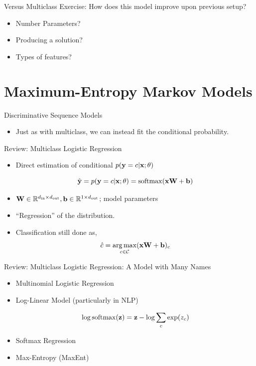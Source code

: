 \documentclass{beamer}
\begin{document}
\begin{frame}{Versus Multiclass}
  Exercise: How does this model improve upon previous setup?
  \begin{itemize}
  \item Number Parameters?
    \air 
  \item Producing a solution?
    \air 

  \item Types of features?
  \end{itemize}
\end{frame}

\section{Maximum-Entropy Markov Models}

\begin{frame}{Discriminative Sequence Models}
  \begin{itemize}
  \item Just as with multiclass, we can instead fit the conditional probability.
    \air 

  \end{itemize}
\end{frame}

\begin{frame}{Review: Multiclass Logistic Regression}
  \begin{itemize}
  \item Direct estimation of conditional $p(\mathbf{y} =c | \mathbf{x}; \theta)$

    \[\hat{\boldy} =  p(\boldy =c | \boldx; \theta) =  \softmax(\boldx \boldW + \boldb) \]
  \item $\mathbf{W} \in \mathbb{R}^{{d_{\mathrm{in}}} \times {d_{\mathrm{out}}}}, \mathbf{b} \in \mathbb{R}^{1 \times {d_{\mathrm{out}}}}$; model parameters

  \item ``Regression'' of the distribution.
  \item Classification still done as,
    \[ \hat{c} =  \argmax_{c \in \mcC} (\boldx \boldW + \boldb)_c  \]

  \end{itemize}
\end{frame}

\begin{frame}{Review: Multiclass Logistic Regression: A Model with Many Names}
  \begin{itemize}
  \item  Multinomial Logistic Regression


  \item Log-Linear Model (particularly in NLP)

    \[\log \softmax(\boldz) = \boldz - \log \sum_{c} \exp(z_c)  \]


  \item Softmax Regression


  \item Max-Entropy (MaxEnt)
  \end{itemize}
\end{frame}
\end{document}
